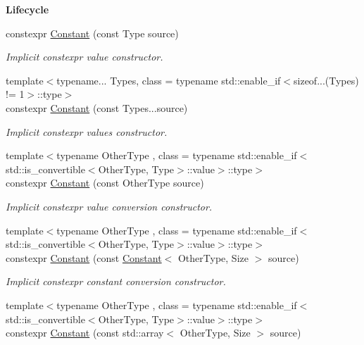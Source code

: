 \begin{Indent}{\bf Lifecycle}\par
\begin{DoxyCompactItemize}
\item 
constexpr \hyperlink{exceptionmagrathea_1_1Constant_a130d19ea63293f208d3f215e97178d01}{Constant} (const Type source)
\begin{DoxyCompactList}\small\item\em Implicit constexpr value constructor. \end{DoxyCompactList}\item 
{\footnotesize template$<$typename... Types, class  = typename std\-::enable\-\_\-if$<$sizeof...(\-Types) != 1$>$\-::type$>$ }\\constexpr \hyperlink{exceptionmagrathea_1_1Constant_a2af330965ee827c54dccd3ab90c7ef10}{Constant} (const Types...\-source)
\begin{DoxyCompactList}\small\item\em Implicit constexpr values constructor. \end{DoxyCompactList}\item 
{\footnotesize template$<$typename Other\-Type , class  = typename std\-::enable\-\_\-if$<$std\-::is\-\_\-convertible$<$\-Other\-Type, Type$>$\-::value$>$\-::type$>$ }\\constexpr \hyperlink{exceptionmagrathea_1_1Constant_af9658fbfea0a0a82ca907de3b0f937b8}{Constant} (const Other\-Type source)
\begin{DoxyCompactList}\small\item\em Implicit constexpr value conversion constructor. \end{DoxyCompactList}\item 
{\footnotesize template$<$typename Other\-Type , class  = typename std\-::enable\-\_\-if$<$std\-::is\-\_\-convertible$<$\-Other\-Type, Type$>$\-::value$>$\-::type$>$ }\\constexpr \hyperlink{exceptionmagrathea_1_1Constant_a34d0bdd690f7e5e23391a9532ae061c9}{Constant} (const \hyperlink{exceptionmagrathea_1_1Constant}{Constant}$<$ Other\-Type, Size $>$ source)
\begin{DoxyCompactList}\small\item\em Implicit constexpr constant conversion constructor. \end{DoxyCompactList}\item 
{\footnotesize template$<$typename Other\-Type , class  = typename std\-::enable\-\_\-if$<$std\-::is\-\_\-convertible$<$\-Other\-Type, Type$>$\-::value$>$\-::type$>$ }\\constexpr \hyperlink{exceptionmagrathea_1_1Constant_ae3aa0f69a77cc956b9a4d032b4615113}{Constant} (const std\-::array$<$ Other\-Type, Size $>$ source)

\end{DoxyCompactItemize}
\end{Indent}
